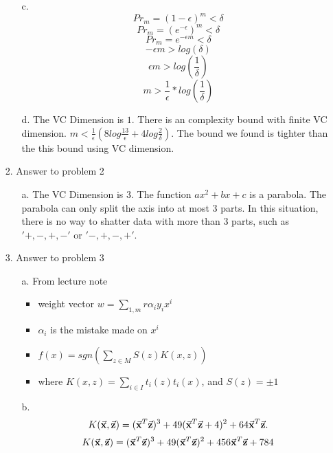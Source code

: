 \begin{enumerate}
\begin{enumerate}
\begin{enumerate}
		\end{enumerate}
	\item[c.]
		\[ Pr_{m} = (1 - \epsilon)^m < \delta \]
		\[ Pr_{m} = (e^{-\epsilon})^m < \delta \]
		\[ Pr_{m} = e^{-\epsilon m} < \delta \]
		\[ -\epsilon m > log(\delta)\]
		\[ \epsilon m > log(\frac{1}{\delta}) \]
		\[ m > \frac{1}{\epsilon} * log(\frac{1}{\delta}) \]
	\item[d.] The VC Dimension is $1$. There is an complexity bound with finite VC dimension. $m < \frac{1}{\epsilon} (8log \frac{13}{\epsilon} + 4log\frac{2}{\delta})$. The bound we found is tighter than the this bound using VC dimension.
	\end{enumerate}
\item[2.] Answer to problem 2
	\begin{enumerate}
	\item[a.] The VC Dimension is $3$. The function $ax^2 + bx + c$ is a parabola. The parabola can only split the axis into at most $3$ parts. In this situation, there is no way to shatter data with more than $3$ parts, such as $'+,-,+,-'$ or $'-,+,-,+'$.
	\end{enumerate}
\item[3.] Answer to problem 3
	\begin{enumerate}
	\item[a.] From lecture note
		\begin{itemize} 
		\item weight vector $w = \sum\nolimits_{1,m} r \alpha_i y_i x^i$ 
		\item $\alpha_i$ is the mistake made on $x^i$
		\item $f(x) = sgn(\sum\nolimits_{z \in M} S(z)K(x,z))$
		\item where $K(x,z) = \sum\limits_{i \in I} t_i(z)t_i(x)$, and $S(z) = \pm 1$
		\end{itemize}
	\item[b.]
		\begin{equation*}
	      K(\vec{{\bf x}},\vec{{\bf z}}) = (\vec{{\bf x}}^T\vec{{\bf z}})^3 
	                                      + 49(\vec{{\bf x}}^T\vec{{\bf z}} + 4)^2 
	                                      + 64 \vec{{\bf x}}^T\vec{{\bf z}}.
	    \end{equation*}
	    \begin{equation*}
	      K(\vec{\bb{x}},\vec{\bb{z}}) = (\vec{\bb{x}}^T\vec{\bb{z}})^3 
	                                      + 49(\vec{\bb{x}}^T\vec{\bb{z}})^2 
	                                      + 456 \vec{\bb{x}}^T\vec{\bb{z}}
	                                      + 784

\end{equation*}
\end{enumerate}
\end{enumerate}
